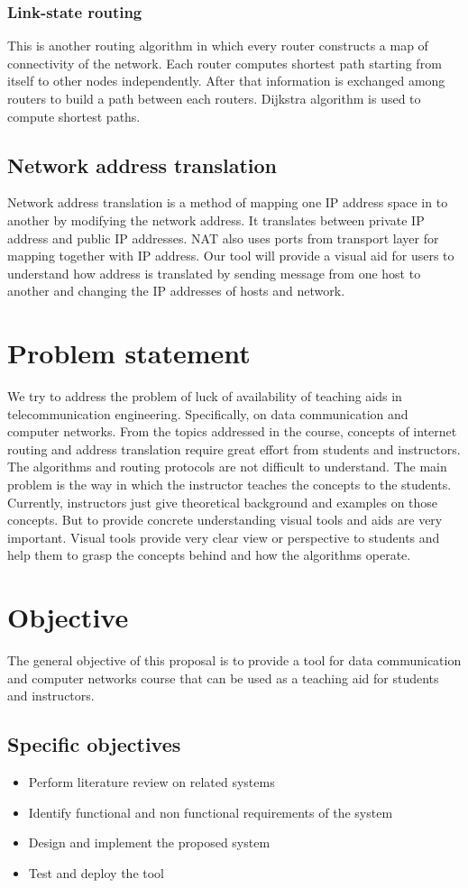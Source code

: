  \subsubsection{Link-state routing}
 
 This is another routing algorithm in which every router constructs a map of connectivity of the network. Each router computes shortest path starting from itself to other nodes independently. After that information is exchanged among routers to build a path between each routers. Dijkstra algorithm is used to compute shortest paths.
 
 \subsection {Network address translation}
 
 Network address translation is a method of mapping one IP address space in to another by modifying the network address. It translates between private IP address and public IP addresses. NAT also uses ports from transport layer for mapping together with IP address. Our tool will provide a visual aid for users to understand how address is translated by sending message from one host to another and changing the IP addresses of hosts and network.
 \pagebreak
 \section{Problem statement}
 
 We try to address the problem of luck of availability of teaching aids in telecommunication engineering. Specifically, on data communication and computer networks. From the topics addressed in the course, concepts of internet routing and address translation require great effort from students and instructors. The algorithms and routing protocols are not difficult to understand. The main problem is the way in which the instructor teaches the concepts to the students. Currently, instructors just give theoretical background and examples on those concepts. But to provide concrete understanding visual tools and aids are very important. Visual tools provide very clear view or perspective to students and help them to grasp the concepts behind and how the algorithms operate. 
 
 \section{Objective}
 The general objective of this proposal is to provide a tool for data communication and computer networks course that can be used as a teaching aid for students and instructors.
 \subsection{Specific objectives}
 
 \begin{itemize}
 	\item Perform literature review on related systems
 	\item Identify functional and non functional requirements of the system
 	\item Design and implement the proposed system
 	\item Test and deploy the tool 
 \end{itemize}